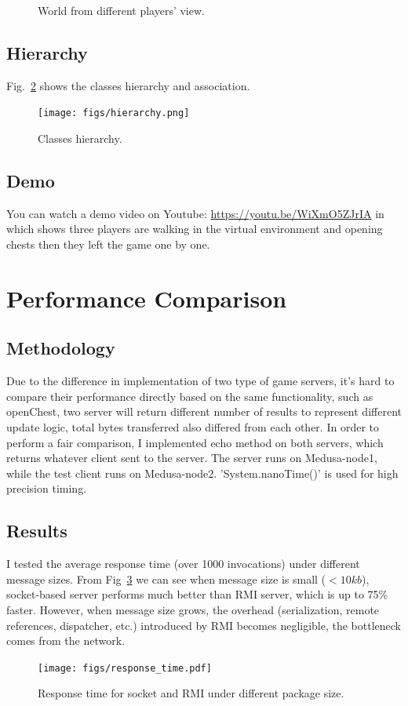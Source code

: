 \documentclass[11pt, oneside]{article}   	%
\begin{document}
\begin{figure}[htbp]
   \caption{World from different players' view.}
   \label{fig:world}
\end{figure} 

\subsection{Hierarchy}
Fig.~\ref{fig:hierarchy} shows the classes hierarchy and association.
\begin{figure}[htbp] %
   \centering
   \texttt{[image: figs/hierarchy.png]}
   \caption{Classes hierarchy.}
   \label{fig:hierarchy}
\end{figure} 

\subsection{Demo}
You can watch a demo video on Youtube: \url{https://youtu.be/WiXmO5ZJrIA} in which shows three players are walking in the virtual environment and opening chests then they left the game one by one.

\section{Performance Comparison}
\subsection{Methodology} 
Due to the difference in implementation of two type of game servers, it's hard to compare their performance directly based on the same functionality, such as openChest, two server will return different number of results to represent different update logic, total bytes transferred also differed from each other. In order to perform a fair comparison, I implemented echo method on both servers, which returns whatever client sent to the server.
The server runs on Medusa-node1, while the test client runs on Medusa-node2. 'System.nanoTime()' is used for high precision timing.

\subsection{Results}
I tested the average response time (over 1000 invocations) under different message sizes. 
From Fig~\ref{fig:response_time} we can see when message size is small ($<10kb$), socket-based server performs much better than RMI server, which is up to 75\% faster. However, when message size grows, the overhead (serialization, remote references, dispatcher, etc.) introduced by RMI becomes negligible, the bottleneck comes from the network.
\begin{figure}[htbp] %
   \centering
   \texttt{[image: figs/response\_time.pdf]}
   \caption{Response time for socket and RMI under different package size.}
   \label{fig:response_time}
\end{figure}
\end{document}
